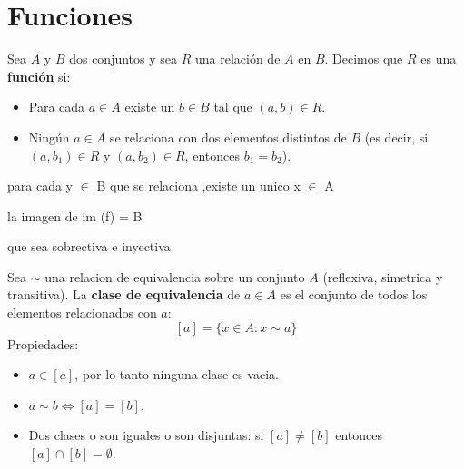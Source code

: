 \section{Funciones}

\begin{definicion}
  Sea $A$ y $B$ dos conjuntos y sea $R$ una relación de $A$ en $B$.
  Decimos que $R$ es una \textbf{función} si:
  \begin{itemize}
    \item Para cada $a \in A$ existe un $b \in B$ tal que $(a,b) \in R$.
    \item Ningún $a \in A$ se relaciona con dos elementos distintos de $B$
      (es decir, si $(a,b_1)\in R$ y $(a,b_2)\in R$, entonces $b_1 = b_2$).
  \end{itemize}
\end{definicion}

\begin{teoria}[title= Prop Funciones]
  \begin{listapropiedades}
    \item[Inyectiva] para cada y $\in$ B que se relaciona ,existe un unico x $\in$ A
    \item[sobreyectiva] la imagen de im (f) = B
    \item[biyectiva] que sea sobrectiva e inyectiva 
  \end{listapropiedades}
\end{teoria}

\begin{teoria}[title= Clases de equivalencia]
    Sea $\sim$ una relacion de equivalencia sobre un conjunto $A$ (reflexiva, simetrica y transitiva). La \textbf{clase de equivalencia} de $a\in A$ es el conjunto de todos los elementos relacionados con $a$:
\[
    [a] = \{ x\in A : x\sim a \}
\]
    Propiedades:
    \begin{itemize}
        \item $a\in[a]$, por lo tanto ninguna clase es vacia.
        \item $a\sim b \iff [a]=[b]$.
        \item Dos clases o son iguales o son disjuntas: si $[a]\neq[b]$ entonces $[a]\cap[b]=\emptyset$.
    \end{itemize}
\end{teoria}